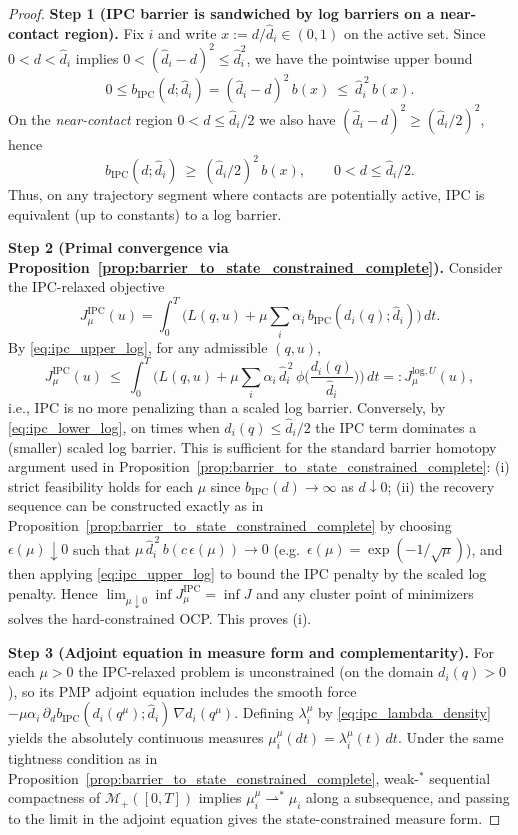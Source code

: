 \documentclass{article} %
\begin{document}
\begin{proof}
\textbf{Step 1 (IPC barrier is sandwiched by log barriers on a near-contact region).}
Fix $i$ and write $x:=d/\hat d_i\in(0,1)$ on the active set. Since $0<d<\hat d_i$ implies
$0<(\hat d_i-d)^2\le \hat d_i^2$, we have the pointwise upper bound
\begin{equation}
\label{eq:ipc_upper_log}
0\le b_{\mathrm{IPC}}(d;\hat d_i)=(\hat d_i-d)^2\,b(x)\ \le\ \hat d_i^{\,2}\,b(x).
\end{equation}
On the \emph{near-contact} region $0<d\le \hat d_i/2$ we also have $(\hat d_i-d)^2\ge (\hat d_i/2)^2$, hence
\begin{equation}
\label{eq:ipc_lower_log}
b_{\mathrm{IPC}}(d;\hat d_i)\ \ge\ (\hat d_i/2)^{2}\,b(x),
\qquad 0<d\le \hat d_i/2.
\end{equation}
Thus, on any trajectory segment where contacts are potentially active, IPC is equivalent (up to constants) to a log barrier.

\textbf{Step 2 (Primal convergence via Proposition~\ref{prop:barrier_to_state_constrained_complete}).}
Consider the IPC-relaxed objective
\[
J_\mu^{\mathrm{IPC}}(u)=\int_0^T\Big(L(q,u)+\mu\sum_i \alpha_i\,b_{\mathrm{IPC}}(d_i(q);\hat d_i)\Big)\,dt.
\]
By \cref{eq:ipc_upper_log}, for any admissible $(q,u)$,
\[
J_\mu^{\mathrm{IPC}}(u)\ \le\ \int_0^T\Big(L(q,u)+\mu\sum_i \alpha_i\,\hat d_i^{\,2}\,\phi\!\Big(\frac{d_i(q)}{\hat d_i}\Big)\Big)\,dt
=:J_\mu^{\mathrm{log},U}(u),
\]
i.e., IPC is no more penalizing than a scaled log barrier.
Conversely, by \cref{eq:ipc_lower_log}, on times when $d_i(q)\le \hat d_i/2$ the IPC term dominates a (smaller) scaled log barrier.
This is sufficient for the standard barrier homotopy argument used in Proposition~\ref{prop:barrier_to_state_constrained_complete}:
(i) strict feasibility holds for each $\mu$ since $b_{\mathrm{IPC}}(d)\to\infty$ as $d\downarrow 0$;
(ii) the recovery sequence can be constructed exactly as in Proposition~\ref{prop:barrier_to_state_constrained_complete} by choosing
$\epsilon(\mu)\downarrow 0$ such that $\mu\,\hat d_i^{\,2}\,b(c\,\epsilon(\mu))\to 0$ (e.g.\ $\epsilon(\mu)=\exp(-1/\sqrt{\mu})$),
and then applying \cref{eq:ipc_upper_log} to bound the IPC penalty by the scaled log penalty.
Hence $\lim_{\mu\downarrow 0}\inf J_\mu^{\mathrm{IPC}}=\inf J$ and any cluster point of minimizers solves the hard-constrained OCP.
This proves (i).

\textbf{Step 3 {(Adjoint equation in measure form and complementarity)}.}
For each $\mu>0$ the IPC-relaxed problem is unconstrained (on the domain $d_i(q)>0$), so its PMP adjoint equation includes the smooth force
$-\mu\alpha_i\,\partial_d b_{\mathrm{IPC}}(d_i(q^\mu);\hat d_i)\,\nabla d_i(q^\mu)$.
Defining $\lambda_i^\mu$ by \cref{eq:ipc_lambda_density} yields the absolutely continuous measures $\mu_i^\mu(dt)=\lambda_i^\mu(t)\,dt$.
Under the same tightness condition as in Proposition~\ref{prop:barrier_to_state_constrained_complete}, weak-$^\ast$ sequential compactness of
$\mathcal M_+([0,T])$ implies $\mu_i^\mu\rightharpoonup^\ast \mu_i$ along a subsequence, and passing to the limit in the adjoint equation gives
the state-constrained measure form.


\end{proof}
\end{document}
